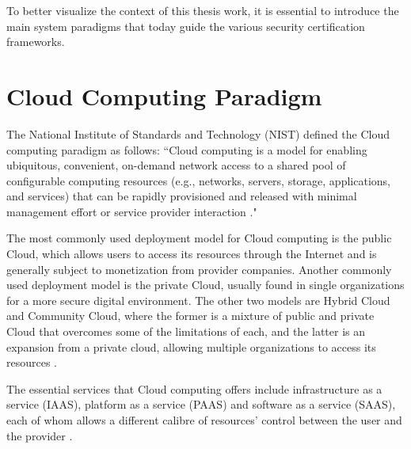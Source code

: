To better visualize the context of this thesis work, it is essential to introduce the main system paradigms that today guide the various security certification frameworks.

\section{Cloud Computing Paradigm}
The National Institute of Standards and Technology (NIST) defined the Cloud computing paradigm as follows: “Cloud computing is a model for enabling ubiquitous, convenient, on-demand network access to a shared pool of configurable computing resources (e.g., networks, servers, storage, applications, and services) that can be rapidly provisioned and released with minimal management effort or service provider interaction \cite{mell2011nist}."

The most commonly used deployment model for Cloud computing is the public Cloud, which allows users to access its resources through the Internet and is generally subject to monetization from provider companies.
Another commonly used deployment model is the private Cloud, usually found in single organizations for a more secure digital environment.
The other two models are Hybrid Cloud and Community Cloud, where the former is a mixture of public and private Cloud that overcomes some of the limitations of each, and the latter is an expansion from a private cloud, allowing multiple organizations to access its resources \cite{atlam2017integration}.

The essential services that Cloud computing offers include infrastructure as a service (IAAS), platform as a service (PAAS) and software as a service (SAAS), each of whom allows a different calibre of resources' control between the user and the provider \cite{khan2019edge}.


